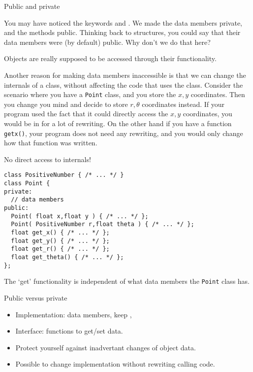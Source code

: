  {Public and private}

You may have noticed the keywords  and
. We made the data members private, and the
methods public. Thinking back to structures, you could say that their
data members were (by default) public. Why don't we do that here?

Objects are really supposed to be accessed through their
functionality.

Another reason for making data members inaccessible is that we can
change the internals of a class, without affecting the code that uses
the class. Consider the scenario where you have a \lstinline{Point} class, and
you store the $x,y$ coordinates. Then you change you mind and decide
to store $r,\theta$ coordinates instead. If your program used the fact
that it could directly access the $x,y$ coordinates, you would be in
for a lot of rewriting. On the other hand if you have a function
\lstinline{getx()}, your program does not need any rewriting, and you would
only change how that function was written.

\begin{block}{No direct access to internals!}
  \label{sl:repr-independent}
\begin{lstlisting}
class PositiveNumber { /* ... */ }
class Point {
private:
  // data members
public:
  Point( float x,float y ) { /* ... */ };
  Point( PositiveNumber r,float theta ) { /* ... */ };
  float get_x() { /* ... */ };
  float get_y() { /* ... */ };
  float get_r() { /* ... */ };
  float get_theta() { /* ... */ };
};
\end{lstlisting}
  The `get' functionality is independent of what data members the
  \lstinline{Point} class has.
\end{block}

\begin{block}{Public versus private}
  \label{sl:interfaceimpl}
  \begin{itemize}
  \item Implementation: data members, keep ,
  \item Interface:  functions to get/set data.
  \item Protect yourself against inadvertant changes of object data.
  \item Possible to change implementation without rewriting calling code.
  \end{itemize}
\end{block}

